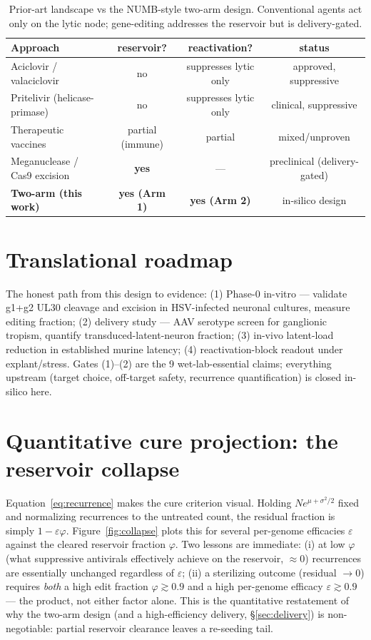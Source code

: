 \documentclass[11pt,a4paper]{article}
\begin{document}
\begin{table}[t]
\centering
\caption{Prior-art landscape vs the NUMB-style two-arm design. Conventional
agents act only on the lytic node; gene-editing addresses the reservoir but is
delivery-gated.}
\label{tab:priorart}
\small
\begin{tabular}{@{}lccc@{}}
\toprule
Approach & reservoir? & reactivation? & status \\
\midrule
Aciclovir / valaciclovir \citep{elion1977} & no & suppresses lytic only & approved, suppressive \\
Pritelivir (helicase-primase) & no & suppresses lytic only & clinical, suppressive \\
Therapeutic vaccines & partial (immune) & partial & mixed/unproven \\
Meganuclease / Cas9 excision \citep{aubert2020} & \textbf{yes} & --- & preclinical (delivery-gated) \\
\textbf{Two-arm (this work)} & \textbf{yes (Arm 1)} & \textbf{yes (Arm 2)} & in-silico design \\
\bottomrule
\end{tabular}
\end{table}

\section{Translational roadmap}
\label{sec:roadmap}
The honest path from this design to evidence: (1) Phase-0 in-vitro --- validate
g1+g2 UL30 cleavage and excision in HSV-infected neuronal cultures, measure
editing fraction; (2) delivery study --- AAV serotype screen for ganglionic
tropism, quantify transduced-latent-neuron fraction; (3) in-vivo latent-load
reduction in established murine latency; (4) reactivation-block readout under
explant/stress. Gates (1)--(2) are the 9 wet-lab-essential claims; everything
upstream (target choice, off-target safety, recurrence quantification) is
closed in-silico here.

\section{Quantitative cure projection: the reservoir collapse}
\label{sec:projection}
Equation~\eqref{eq:recurrence} makes the cure criterion visual. Holding
$N e^{\mu+\sigma^2/2}$ fixed and normalizing recurrences to the untreated count,
the residual fraction is simply $1-\varepsilon\varphi$. Figure~\ref{fig:collapse}
plots this for several per-genome efficacies $\varepsilon$ against the cleared
reservoir fraction $\varphi$. Two lessons are immediate: (i) at low $\varphi$
(what suppressive antivirals effectively achieve on the reservoir, $\approx 0$)
recurrences are essentially unchanged regardless of $\varepsilon$; (ii) a
sterilizing outcome (residual $\to 0$) requires \emph{both} a high edit fraction
$\varphi\gtrsim 0.9$ and a high per-genome efficacy $\varepsilon\gtrsim 0.9$ ---
the product, not either factor alone. This is the quantitative restatement of
why the two-arm design (and a high-efficiency delivery, \S\ref{sec:delivery}) is
non-negotiable: partial reservoir clearance leaves a re-seeding tail.
\end{document}
